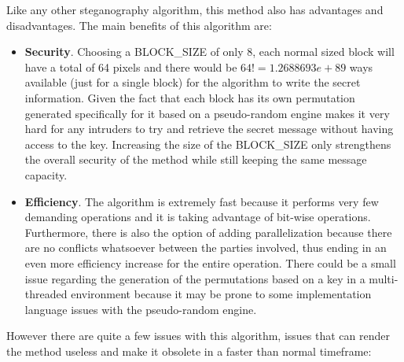 Like any other steganography algorithm, this method also has advantages and disadvantages. The main benefits of this algorithm are:
\begin{itemize}
  \item \textbf{Security}. Choosing a BLOCK\_SIZE of only 8, each normal sized block will have a total of 64 pixels and there would be $64! = 1.2688693e+89$ ways available (just for a single block) for the algorithm to write the secret information. Given the fact that each block has its own permutation generated specifically for it based on a pseudo-random engine makes it very hard for any intruders to try and retrieve the secret message without having access to the key. Increasing the size of the BLOCK\_SIZE only strengthens the overall security of the method while still keeping the same message capacity.
 \item \textbf{Efficiency}. The algorithm is extremely fast because it performs very few demanding operations and it is taking advantage of bit-wise operations. Furthermore, there is also the option of adding parallelization because there are no conflicts whatsoever between the parties involved, thus ending in an even more efficiency increase for the entire operation. There could be a small issue regarding the generation of the permutations based on a key in a multi-threaded environment because it may be prone to some implementation language issues with the pseudo-random engine.
\end{itemize}
However there are quite a few issues with this algorithm, issues that can render the method useless and make it obsolete in a faster than normal timeframe:
